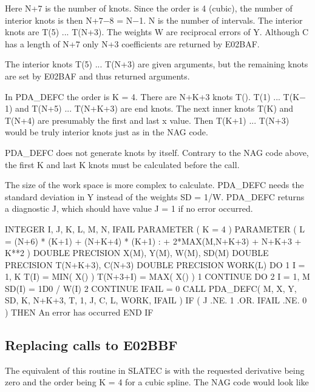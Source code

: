 \documentclass[11pt,twoside,nolof]{starlink}
\begin{document}
   Here N+7 is the number of knots. Since the order is 4 (cubic), the
   number of interior knots is then N+7$-$8 = N$-$1. N is the number of
   intervals. The interior knots are T(5) ... T(N+3). The weights W are
   reciprocal errors of Y. Although C has a length of N+7 only N+3
   coefficients are returned by E02BAF.

   The interior knots T(5) ... T(N+3) are given arguments, but the
   remaining knots are set by E02BAF and thus returned arguments.

   In PDA\_DEFC the order is K = 4. There are N+K+3 knots T(). T(1) ...
   T(K$-$1) and T(N+5) ... T(N+K+3) are end knots. The next
   inner knots T(K) and T(N+4) are presumably the first and last x
   value. Then T(K+1) ... T(N+3) would be truly interior knots just as
   in the NAG code.

   PDA\_DEFC does not generate knots by itself. Contrary to the NAG code
   above, the first K and last K knots must be calculated before the
   call.

   The size of the work space is more complex to calculate. PDA\_DEFC needs
   the standard deviation in Y instead of the weights SD = 1/W. PDA\_DEFC
   returns a diagnostic J, which should have value J = 1 if no error
   occurred.

\begin{terminalv}
      INTEGER I, J, K, L, M, N, IFAIL
      PARAMETER ( K = 4 )
      PARAMETER ( L = (N+6) * (K+1)  + (N+K+4) * (K+1)
     :              + 2*MAX(M,N+K+3) + N+K+3 + K**2 )
      DOUBLE PRECISION X(M), Y(M), W(M), SD(M)
      DOUBLE PRECISION T(N+K+3), C(N+3)
      DOUBLE PRECISION WORK(L)
      DO 1 I = 1, K
         T(I)     = MIN( X() )
         T(N+3+I) = MAX( X() )
    1 CONTINUE
      DO 2 I = 1, M
         SD(I) = 1D0 / W(I)
    2 CONTINUE
      IFAIL = 0
      CALL PDA_DEFC( M, X, Y, SD, K, N+K+3, T, 1, J, C, L, WORK, IFAIL )
      IF ( J .NE. 1 .OR. IFAIL .NE. 0 ) THEN
         An error has occurred
      END IF
\end{terminalv}


\subsection{Replacing calls to E02BBF}

   The equivalent of this routine in SLATEC is
   with the requested
   derivative being zero and the order being K = 4 for a cubic spline.
   The NAG code would look like
\end{document}
